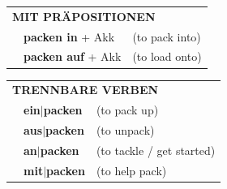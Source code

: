\documentclass[10pt,a4paper]{revtex4-2}
\begin{document}
\begin{verbbox}
\vspace{10pt}

\begin{tabular}{lll}
\multicolumn{3}{l}{\textbf{MIT PRÄPOSITIONEN}}\\
& \textbf{packen in} + Akk & (to pack into)\\
& \textbf{packen auf} + Akk & (to load onto)\\
\end{tabular}
\hfill
\begin{tabular}{lll}
\multicolumn{3}{l}{\textbf{TRENNBARE VERBEN}}\\
& \textbf{ein$|$packen} & (to pack up)\\
& \textbf{aus$|$packen} & (to unpack)\\
& \textbf{an$|$packen} & (to tackle / get started)\\
& \textbf{mit$|$packen} & (to help pack)\\
\end{tabular}
\vspace{-5pt}
\end{verbbox}
\end{document}

